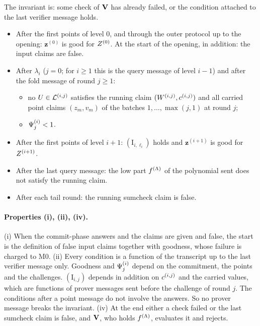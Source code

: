 The invariant is: some check of $\mathbf{V}$ has already failed, or the condition attached to the last verifier message holds.
\begin{itemize}[itemsep=1pt,topsep=2pt]
\item After the first points of level $0$, and through the outer protocol up to the opening: $\mathbf z^{(0)}$ is good for $Z^{(0)}$. At the start of the opening, in addition: the input claims are false.
\item After $\lambda_i$ ($j=0$; for $i\ge1$ this is the query message of level $i-1$) and after the fold message of round $j\ge1$:
\begin{itemize}[itemsep=0pt,topsep=1pt]
\item[$(\mathrm I_{i,j})$] no $U\in\mathcal{L}^{(i,j)}$ satisfies the running claim $(W^{(i,j)},c^{(i,j)})$ and all carried point claims $(z_m,v_m)$ of the batches $1,\dots,\max(j,1)$ at round $j$;
\item[$(\mathrm G_{i,j})$] $\Psi^{(i)}_j<1$.
\end{itemize}
\item After the first points of level $i+1$: $(\mathrm I_{i,\ell_i})$ holds and $\mathbf z^{(i+1)}$ is good for $Z^{(i+1)}$.
\item After the last query message: the low part $f^{(\Lambda)}$ of the polynomial sent does not satisfy the running claim.
\item After each tail round: the running sumcheck claim is false.
\end{itemize}

\paragraph{Properties (i), (ii), (iv).} (i) When the commit-phase answers and the claims are given and false, the start is the definition of false input claims together with goodness, whose failure is charged to M0. (ii) Every condition is a function of the transcript up to the last verifier message only. Goodness and $\Psi^{(i)}_j$ depend on the commitment, the points and the challenges. $(\mathrm I_{i,j})$ depends in addition on $c^{(i,j)}$ and the carried values, which are functions of prover messages sent before the challenge of round $j$. The conditions after a point message do not involve the answers. So no prover message breaks the invariant. (iv) At the end either a check failed or the last sumcheck claim is false, and $\mathbf{V}$, who holds $f^{(\Lambda)}$, evaluates it and rejects.

